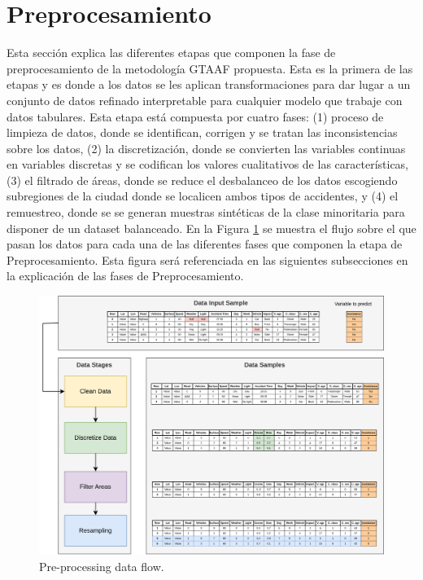 \documentclass{uathesis-es}
\begin{document}
\section{Preprocesamiento}

Esta sección explica las diferentes etapas que componen la fase de preprocesamiento de la metodología GTAAF propuesta. Esta es la primera de las etapas y es donde a los datos se les aplican transformaciones para dar lugar a un conjunto de datos refinado interpretable para cualquier modelo que trabaje con datos tabulares. Esta etapa está compuesta por cuatro fases: (1) proceso de limpieza de datos, donde se identifican, corrigen y se tratan las inconsistencias sobre los datos, (2) la discretización, donde se convierten las variables continuas en variables discretas y se codifican los valores cualitativos de las características, (3) el filtrado de áreas, donde se reduce el desbalanceo de los datos escogiendo subregiones de la ciudad donde se localicen ambos tipos de accidentes, y (4) el remuestreo, donde se se generan muestras sintéticas de la clase minoritaria para disponer de un dataset balanceado. En la Figura \ref{PreprocessingStage} se muestra el flujo sobre el que pasan los datos para cada una de las diferentes fases que componen la etapa de Preprocesamiento. Esta figura será referenciada en las siguientes subsecciones en la explicación de las fases de Preprocesamiento.

\begin{figure}[H]
    \centering
    \includegraphics[width=17cm]{Figures/Preprocessing.png}
    \caption{Pre-processing data flow.}
    \label{PreprocessingStage}
\end{figure}
\end{document}
